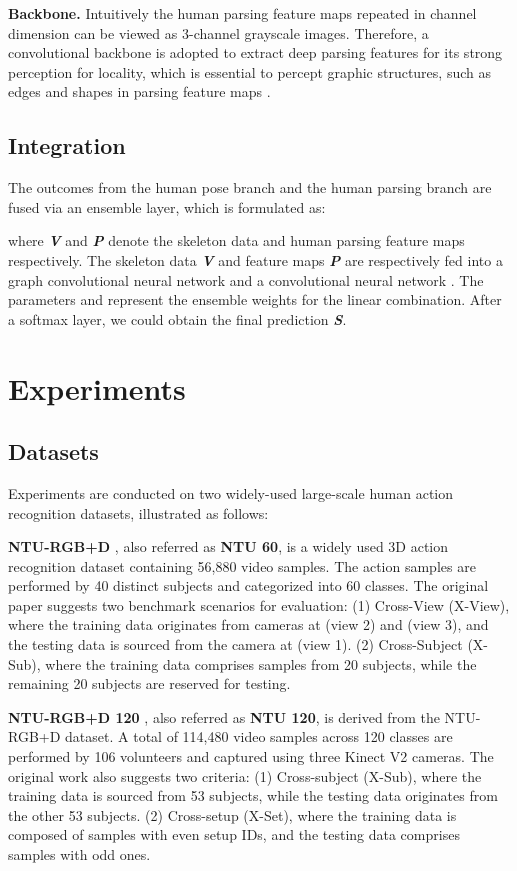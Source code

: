 \documentclass[runningheads]{llncs}
\begin{document}
\textbf{Backbone.} Intuitively the human parsing feature maps repeated in channel dimension can be viewed as 3-channel grayscale images. Therefore, a convolutional backbone is adopted to extract deep parsing features for its strong perception for locality, which is essential to percept graphic structures, such as edges and shapes in parsing feature maps .

\subsection{Integration}
\label{section:Integration}
The outcomes from the human pose branch and the human parsing branch are fused via an ensemble layer, which is formulated as:

where \textit{\textbf{V}} and \textit{\textbf{P}} denote the skeleton data and human parsing feature maps respectively. The skeleton data \textit{\textbf{V}} and feature maps \textit{\textbf{P}} are respectively fed into a graph convolutional neural network  and a convolutional neural network . The parameters  and  represent the ensemble weights for the linear combination. After a softmax layer, we could obtain the final prediction \textit{\textbf{S}}.

\section{Experiments}
\subsection{Datasets}
Experiments are conducted on two widely-used large-scale human action recognition datasets, illustrated as follows:

\textbf{NTU-RGB+D} \cite{7780484}, also referred as \textbf{NTU 60}, is a widely used 3D action recognition dataset containing 56,880 video samples. The action samples are performed by 40 distinct subjects and categorized into 60 classes. The original paper \cite{7780484} suggests two benchmark scenarios for evaluation: (1) Cross-View (X-View), where the training data originates from cameras at  (view 2) and  (view 3), and the testing data is sourced from the camera at  (view 1). (2) Cross-Subject (X-Sub), where the training data comprises samples from 20 subjects, while the remaining 20 subjects are reserved for testing.

\textbf{NTU-RGB+D 120} \cite{8713892}, also referred as \textbf{NTU 120}, is derived from the NTU-RGB+D dataset. A total of 114,480 video samples across 120 classes are performed by 106 volunteers and captured using three Kinect V2 cameras. The original work \cite{8713892} also suggests two criteria: (1) Cross-subject (X-Sub), where the training data is sourced from 53 subjects, while the testing data originates from the other 53 subjects. (2) Cross-setup (X-Set), where the training data is composed of samples with even setup IDs, and the testing data comprises samples with odd ones.
\end{document}

